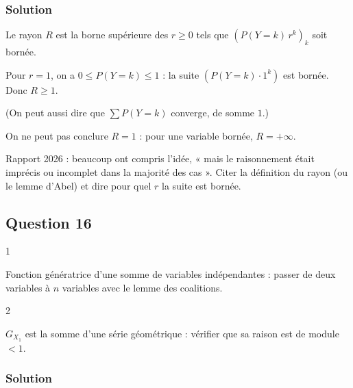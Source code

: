 \documentclass[11pt,a4paper]{article}
\begin{document}
\hypertarget{solution-14}{%
\subsubsection{Solution}\label{solution-14}}

Le rayon \(R\) est la borne supérieure des \(r\ge0\) tels que \((P(Y=k)\,r^k)_k\) soit bornée.

Pour \(r=1\), on a \(0\le P(Y=k)\le1\) : la suite \((P(Y=k)\cdot1^k)\) est bornée. Donc \(\boxed{R\ge1}\).

(On peut aussi dire que \(\sum P(Y=k)\) converge, de somme \(1\).)

\begin{piege}

On ne peut pas conclure \(R=1\) : pour une variable bornée, \(R=+\infty\).

\end{piege}

\begin{jury}

Rapport 2026 : beaucoup ont compris l'idée, « mais le raisonnement était imprécis ou incomplet dans la majorité des cas ». Citer la définition du rayon (ou le lemme d'Abel) et dire pour quel \(r\) la suite est bornée.

\end{jury}

\hypertarget{question-16}{%
\subsection{Question 16}\label{question-16}}

\begin{indication}{1}

Fonction génératrice d'une somme de variables indépendantes : passer de deux variables à \(n\) variables avec le lemme des coalitions.

\end{indication}

\begin{indication}{2}

\(G_{X_1}\) est la somme d'une série géométrique : vérifier que sa raison est de module \(<1\).

\end{indication}

\hypertarget{solution-15}{%
\subsubsection{Solution}\label{solution-15}}
\end{document}
